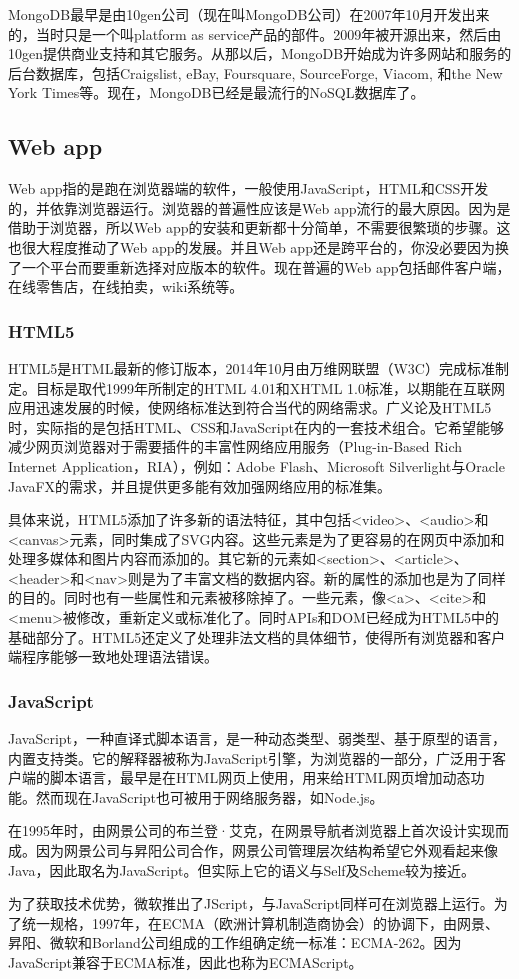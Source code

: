 MongoDB最早是由10gen公司（现在叫MongoDB公司）在2007年10月开发出来的，当时只是一个叫platform as service产品的部件。2009年被开源出来，然后由10gen提供商业支持和其它服务。从那以后，MongoDB开始成为许多网站和服务的后台数据库，包括Craigslist, eBay, Foursquare, SourceForge, Viacom, 和the New York Times等。现在，MongoDB已经是最流行的NoSQL数据库了。\cite{mongodb}

\subsection{Web app}

Web app指的是跑在浏览器端的软件，一般使用JavaScript，HTML和CSS开发的，并依靠浏览器运行。浏览器的普遍性应该是Web app流行的最大原因。因为是借助于浏览器，所以Web app的安装和更新都十分简单，不需要很繁琐的步骤。这也很大程度推动了Web app的发展。并且Web app还是跨平台的，你没必要因为换了一个平台而要重新选择对应版本的软件。现在普遍的Web app包括邮件客户端，在线零售店，在线拍卖，wiki系统等。

\subsubsection{HTML5}

HTML5是HTML最新的修订版本，2014年10月由万维网联盟（W3C）完成标准制定。目标是取代1999年所制定的HTML 4.01和XHTML 1.0标准，以期能在互联网应用迅速发展的时候，使网络标准达到符合当代的网络需求。广义论及HTML5时，实际指的是包括HTML、CSS和JavaScript在内的一套技术组合。它希望能够减少网页浏览器对于需要插件的丰富性网络应用服务（Plug-in-Based Rich Internet Application，RIA），例如：Adobe Flash、Microsoft Silverlight与Oracle JavaFX的需求，并且提供更多能有效加强网络应用的标准集。

具体来说，HTML5添加了许多新的语法特征，其中包括<video>、<audio>和<canvas>元素，同时集成了SVG内容。这些元素是为了更容易的在网页中添加和处理多媒体和图片内容而添加的。其它新的元素如<section>、<article>、<header>和<nav>则是为了丰富文档的数据内容。新的属性的添加也是为了同样的目的。同时也有一些属性和元素被移除掉了。一些元素，像<a>、<cite>和<menu>被修改，重新定义或标准化了。同时APIs和DOM已经成为HTML5中的基础部分了。HTML5还定义了处理非法文档的具体细节，使得所有浏览器和客户端程序能够一致地处理语法错误。

\subsubsection{JavaScript}

JavaScript，一种直译式脚本语言，是一种动态类型、弱类型、基于原型的语言，内置支持类。它的解释器被称为JavaScript引擎，为浏览器的一部分，广泛用于客户端的脚本语言，最早是在HTML网页上使用，用来给HTML网页增加动态功能。然而现在JavaScript也可被用于网络服务器，如Node.js。

在1995年时，由网景公司的布兰登·艾克，在网景导航者浏览器上首次设计实现而成。因为网景公司与昇阳公司合作，网景公司管理层次结构希望它外观看起来像Java，因此取名为JavaScript。但实际上它的语义与Self及Scheme较为接近。

为了获取技术优势，微软推出了JScript，与JavaScript同样可在浏览器上运行。为了统一规格，1997年，在ECMA（欧洲计算机制造商协会）的协调下，由网景、昇阳、微软和Borland公司组成的工作组确定统一标准：ECMA-262。因为JavaScript兼容于ECMA标准，因此也称为ECMAScript。
